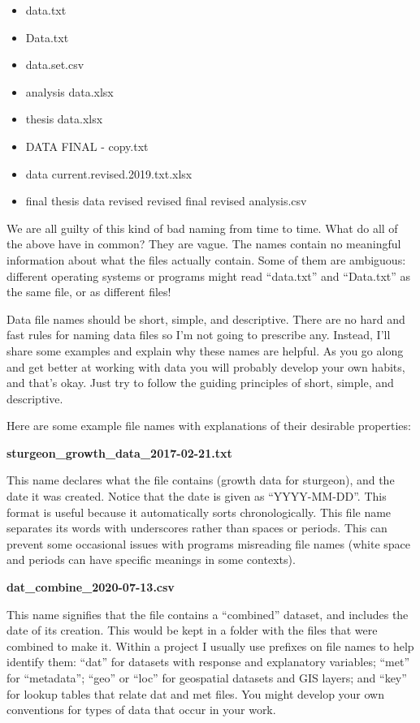 \documentclass[
  13,
  letterpaper,
]{report}
\begin{document}
\begin{itemize}
\item
  data.txt
\item
  Data.txt
\item
  data.set.csv
\item
  analysis data.xlsx
\item
  thesis data.xlsx
\item
  DATA FINAL - copy.txt
\item
  data current.revised.2019.txt.xlsx
\item
  final thesis data revised revised final revised analysis.csv
\end{itemize}

We are all guilty of this kind of bad naming from time to time. What do
all of the above have in common? They are vague. The names contain no
meaningful information about what the files actually contain. Some of
them are ambiguous: different operating systems or programs might read
``data.txt'' and ``Data.txt'' as the same file, or as different files!

Data file names should be short, simple, and descriptive. There are no
hard and fast rules for naming data files so I'm not going to prescribe
any. Instead, I'll share some examples and explain why these names are
helpful. As you go along and get better at working with data you will
probably develop your own habits, and that's okay. Just try to follow
the guiding principles of short, simple, and descriptive.

Here are some example file names with explanations of their desirable
properties:

\textbf{sturgeon\_growth\_data\_2017-02-21.txt}

This name declares what the file contains (growth data for sturgeon),
and the date it was created. Notice that the date is given as
``YYYY-MM-DD''. This format is useful because it automatically sorts
chronologically. This file name separates its words with underscores
rather than spaces or periods. This can prevent some occasional issues
with programs misreading file names (white space and periods can have
specific meanings in some contexts).

\textbf{dat\_combine\_2020-07-13.csv}

This name signifies that the file contains a ``combined'' dataset, and
includes the date of its creation. This would be kept in a folder with
the files that were combined to make it. Within a project I usually use
prefixes on file names to help identify them: ``dat'' for datasets with
response and explanatory variables; ``met'' for ``metadata''; ``geo'' or
``loc'' for geospatial datasets and GIS layers; and ``key'' for lookup
tables that relate dat and met files. You might develop your own
conventions for types of data that occur in your work.
\end{document}
